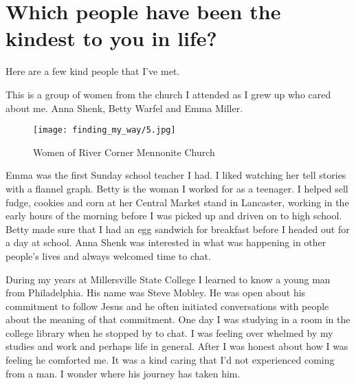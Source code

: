 \section{Which people have been the kindest to you in life?}
Here are a few kind people that I've met.

This is a group of women from the church I attended as I grew up who cared about me.
Anna Shenk, Betty Warfel and Emma Miller.
\begin{figure}
\centering
\texttt{[image: finding\_my\_way/5.jpg]}
\caption{
Women of River Corner Mennonite Church
}
\end{figure}

Emma was the first Sunday school teacher I had.
I liked watching her tell stories with a flannel graph.
Betty is the woman I worked for as a teenager.
I helped sell fudge, cookies and corn at her Central Market stand in Lancaster, working in the early hours of the morning before I was picked up and driven on to high school.
Betty made sure that I had an egg sandwich for breakfast before I headed out for a day at school.
Anna Shenk was interested in what was happening in other people's lives and always welcomed time to chat.

 During my years at Millersville State College I learned to know a young man from Philadelphia.
His name was Steve Mobley.
He was open about his commitment to follow Jesus and he often initiated conversations with people about the meaning of that commitment.
One day I was studying in a room in the college library when he stopped by to chat.
I was feeling over whelmed by my studies and work and perhaps life in general.
After I was honest about how I was feeling he comforted me.
It was a kind caring that I'd not experienced coming from a man.
I wonder where his journey has taken him.






